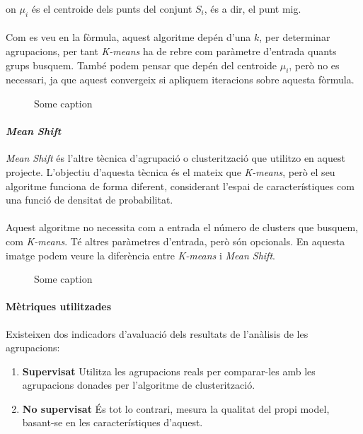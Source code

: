 \documentclass[11pt,a4paper,catalan]{article}
\begin{document}
on $\mu_i$ és el centroide dels punts del conjunt $S_i$, és a dir, el punt mig.
\\
\\
Com es veu en la fòrmula, aquest algoritme depén d'una $k$, per determinar agrupacions, per tant \textit{K-means} ha de rebre com paràmetre d'entrada quants grups busquem. També podem pensar que depén del centroide $\mu_i$, però no es necessari, ja que aquest convergeix si apliquem iteracions sobre aquesta fòrmula.

\begin{figure}[h]
\centering
{}
\caption{Some caption}
\end{figure}

\newpage

\paragraph{\textit{Mean Shift}}
\textit{Mean Shift} és l'altre tècnica d'agrupació o clusterització que utilitzo en aquest projecte. L'objectiu d'aquesta tècnica és el mateix que \textit{K-means}, però el seu algoritme funciona de forma diferent, considerant l'espai de característiques com una funció de densitat de probabilitat.
\\
\\
Aquest algoritme no necessita com a entrada el número de clusters que busquem, com \textit{K-means}. Té altres paràmetres d'entrada, però són opcionals. En aquesta imatge podem veure la diferència entre \textit{K-means} i \textit{Mean Shift}.

\begin{figure}[h]
\centering
{}
\caption{Some caption}
\end{figure}

\newpage

\paragraph{Mètriques utilitzades}
Existeixen dos indicadors d'avaluació dels resultats de l'anàlisis de les agrupacions:
\begin{enumerate}
	\item \textbf{Supervisat} Utilitza les agrupacions reals per comparar-les amb les agrupacions donades per l'algoritme de clusterització.
	\item \textbf{No supervisat} És tot lo contrari, mesura la qualitat del propi model, basant-se en les característiques d'aquest.
\end{enumerate}
\end{document}
